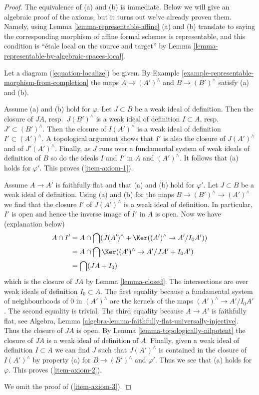 \begin{proof}
The equivalence of (a) and (b) is immediate. Below we will give an
algebraic proof of the axioms, but it turns out we've already proven
them. Namely, using Lemma \ref{lemma-representable-affine}
(a) and (b) translate to saying the corresponding morphism of
affine formal schemes is representable, and this condition is
``\'etale local on the source and target'' by
Lemma \ref{lemma-representable-by-algebraic-spaces-local}.

\medskip\noindent
Let a diagram (\ref{equation-localize}) be given.
By Example \ref{example-representable-morphism-from-completion}
the maps $A \to (A')^\wedge$ and $B \to (B')^\wedge$
satisfy (a) and (b).

\medskip\noindent
Assume (a) and (b) hold for $\varphi$. Let $J \subset B$ be a weak ideal
of definition. Then the closure of $JA$, resp.\ $J(B')^\wedge$
is a weak ideal of definition $I \subset A$, resp.\ $J' \subset (B')^\wedge$.
Then the closure of $I(A')^\wedge$ is a weak ideal of definition
$I' \subset (A')^\wedge$. A topological argument shows that $I'$ is also
the closure of $J(A')^\wedge$ and of $J'(A')^\wedge$.
Finally, as $J$ runs over a fundamental system of weak ideals of definition
of $B$ so do the ideals $I$ and $I'$ in $A$ and $(A')^\wedge$.
It follows that (a) holds for $\varphi'$. This proves (\ref{item-axiom-1}).

\medskip\noindent
Assume $A \to A'$ is faithfully flat and that (a) and (b) hold for $\varphi'$.
Let $J \subset B$ be a weak ideal of definition. Using (a) and (b)
for the maps $B \to (B')^\wedge \to (A')^\wedge$ we find that the
closure $I'$ of $J(A')^\wedge$ is a weak ideal of definition.
In particular, $I'$ is open and hence the inverse image of $I'$
in $A$ is open. Now we have (explanation below)
\begin{align*}
A \cap I'
& =
A \cap \bigcap (J(A')^\wedge + \Ker((A')^\wedge \to A'/I_0A')) \\
& =
A \cap \bigcap \Ker((A')^\wedge \to A'/JA' + I_0 A') \\
& = \bigcap (JA + I_0)
\end{align*}
which is the closure of $JA$ by Lemma \ref{lemma-closed}.
The intersections are over weak ideals of definition $I_0 \subset A$.
The first equality because a fundamental system of neighbourhoods of
$0$ in $(A')^\wedge$ are the kernels of the maps $(A')^\wedge \to A'/I_0A'$.
The second equality is trivial. The third equality because $A \to A'$
is faithfully flat, see
Algebra, Lemma \ref{algebra-lemma-faithfully-flat-universally-injective}.
Thus the closure of $JA$ is open. By Lemma \ref{lemma-topologically-nilpotent}
the closure of $JA$
is a weak ideal of definition of $A$. Finally, given a weak
ideal of definition $I \subset A$ we can find $J$ such that
$J(A')^\wedge$ is contained in the closure of $I(A')^\wedge$
by property (a) for $B \to (B')^\wedge$ and $\varphi'$.
Thus we see that (a) holds for $\varphi$. This proves (\ref{item-axiom-2}).

\medskip\noindent
We omit the proof of (\ref{item-axiom-3}).
\end{proof}

